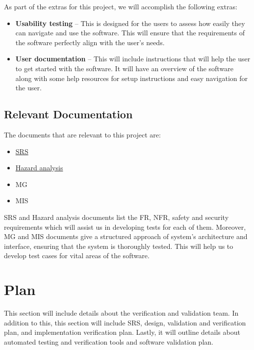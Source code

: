 \documentclass[12pt, titlepage]{article}
\begin{document}
As part of the extras for this project, we will accomplish the following extras:

\begin{itemize}
  \item \textbf{Usability testing} -- This is designed for the users to assess how easily they can navigate and use the software. This will ensure that the requirements of the software perfectly align with the user's needs.
  \item \textbf{User documentation} -- This will include instructions that will help the user to get started with the software. It will have an overview of the software along with some help resources for setup instructions and easy navigation for the user.
\end{itemize}

\subsection{Relevant Documentation} \label{section:2.4}

The documents that are relevant to this project are:
\begin{itemize}
  \item \href{https://github.com/Inreet-Kaur/capstone/blob/main/docs/SRS/SRS.pdf}{SRS} \citep{SRS1}
  \item \href{https://github.com/Inreet-Kaur/capstone/blob/main/docs/HazardAnalysis/HazardAnalysis.pdf}{Hazard analysis}  \citep{HazardAnalysis}
  \item MG
  \item MIS
\end{itemize}
SRS and Hazard analysis documents list the FR, NFR, safety and security requirements which will assist us in developing tests for each of them. Moreover, MG and MIS documents give a structured approach of system's architecture and interface, ensuring that the system is thoroughly tested. This will help us to develop test cases for vital areas of the software.  


\section{Plan} \label{section:3}

This section will include details about the verification and validation team. In addition to this, this section will include SRS, design, validation and verification plan, and implementation verification plan. Lastly, it will outline details about automated testing and verification tools and software validation plan.
\end{document}

